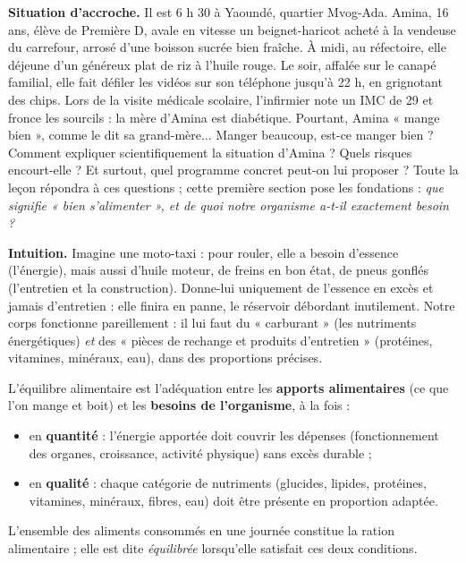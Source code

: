 \documentclass[11pt]{article}
\newcommand{\cle}[1]{{\popxbold\color{popdark}#1}}
\newcounter{popsec}
\newcounter{popsub}
\newcommand{\courssub}[1]{%
  \stepcounter{popsub}%
  \par\vspace{9pt}\noindent{\popxbold\fontsize{11.5}{13}\selectfont\color{popink}{\color{poporange}\thepopsec.\thepopsub}\hspace{6pt}#1}\par\nopagebreak\vspace{4pt}
}
\begin{document}
\textbf{Situation d'accroche.} Il est 6 h 30 à Yaoundé, quartier Mvog-Ada. Amina, 16 ans, élève de Première D, avale en vitesse un beignet-haricot acheté à la vendeuse du carrefour, arrosé d'une boisson sucrée bien fraîche. À midi, au réfectoire, elle déjeune d'un généreux plat de riz à l'huile rouge. Le soir, affalée sur le canapé familial, elle fait défiler les vidéos sur son téléphone jusqu'à 22 h, en grignotant des chips. Lors de la visite médicale scolaire, l'infirmier note un IMC de 29 et fronce les sourcils : la mère d'Amina est diabétique. Pourtant, Amina « mange bien », comme le dit sa grand-mère... Manger beaucoup, est-ce manger bien ? Comment expliquer scientifiquement la situation d'Amina ? Quels risques encourt-elle ? Et surtout, quel programme concret peut-on lui proposer ? Toute la leçon répondra à ces questions ; cette première section pose les fondations : \emph{que signifie « bien s'alimenter », et de quoi notre organisme a-t-il exactement besoin ?}

\courssub{Qu'est-ce que l'équilibre alimentaire ?}

\textbf{Intuition.} Imagine une moto-taxi : pour rouler, elle a besoin d'essence (l'énergie), mais aussi d'huile moteur, de freins en bon état, de pneus gonflés (l'entretien et la construction). Donne-lui uniquement de l'essence en excès et jamais d'entretien : elle finira en panne, le réservoir débordant inutilement. Notre corps fonctionne pareillement : il lui faut du « carburant » (les nutriments énergétiques) \emph{et} des « pièces de rechange et produits d'entretien » (protéines, vitamines, minéraux, eau), dans des proportions précises.

\begin{definition}
L'\cle{équilibre alimentaire} est l'adéquation entre les \textbf{apports alimentaires} (ce que l'on mange et boit) et les \textbf{besoins de l'organisme}, à la fois :
\begin{itemize}
\item en \textbf{quantité} : l'énergie apportée doit couvrir les dépenses (fonctionnement des organes, croissance, activité physique) sans excès durable ;
\item en \textbf{qualité} : chaque catégorie de nutriments (glucides, lipides, protéines, vitamines, minéraux, fibres, eau) doit être présente en proportion adaptée.
\end{itemize}
L'ensemble des aliments consommés en une journée constitue la \cle{ration alimentaire} ; elle est dite \emph{équilibrée} lorsqu'elle satisfait ces deux conditions.
\end{definition}
\end{document}
